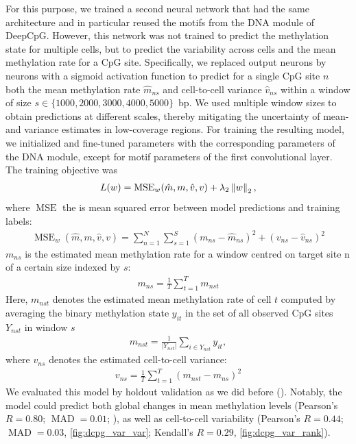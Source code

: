 For this purpose, we trained a second neural network that had the same architecture and in particular reused the motifs from the DNA module of DeepCpG. However, this network was not trained to predict the methylation state for multiple cells, but to predict the variability across cells and the mean methylation rate for a CpG site. Specifically, we replaced output neurons by neurons with a sigmoid activation function to predict for a single CpG site $n$ both the mean methylation rate $\hat{m}_{ns}$ and cell-to-cell variance $\hat{v}_{ns}$ within a window of size $s\in\{1000,2000,3000,4000,5000\}$~bp. We used multiple window sizes to obtain predictions at different scales, thereby mitigating the uncertainty of mean- and variance estimates in low-coverage regions. For training the resulting model, we initialized and fine-tuned parameters with the corresponding parameters of the DNA module, except for motif parameters of the first convolutional layer. The training objective was
\newcommand{\Xmse}{\operatorname{MSE}}
\begin{align}
  L(w)=\Xmse_w (\hat{m},m,\hat{v},v)+\lambda_2 \norm{w}_2,
\end{align}
where $\Xmse$ the is mean squared error between model predictions and training labels:
\begin{align}
  \Xmse_w(\hat{m},m,\hat{v},v)=\sum_{n=1}^{N}\sum_{s=1}^S (m_{ns}-\hat{m}_{ns})^2+(v_{ns}-\hat{v}_{ns})^2
\end{align}
$m_{ns}$ is the estimated mean methylation rate for a window centred on target site n of a certain size indexed by $s$:
\begin{align}
  m_{ns}=\frac{1}{T}\sum_{t=1}^T m_{nst}
\end{align}
Here, $m_{nst}$ denotes the estimated mean methylation rate of cell $t$ computed by averaging the binary methylation state $y_{it}$ in the set of all observed CpG sites $Y_{nst}$ in window $s$
\begin{align}
  m_{nst}=\frac{1}{|Y_{nst}|} \sum_{i \in Y_{nst}} y_{it},
\end{align}
where $v_{ns}$ denotes the estimated cell-to-cell variance:
\begin{align}
  v_{ns}=\frac{1}{T} \sum_{t=1}^T (m_{nst}-m_{ns})^2
\end{align}
We evaluated this model by holdout validation as we did before (). Notably, the model could predict both global changes in mean methylation levels (Pearson's $R=0.80$; $\operatorname{MAD}=0.01$; ), as well as cell-to-cell variability (Pearson's $R=0.44$; $\operatorname{MAD}=0.03$, \cref{fig:dcpg_var_var}; Kendall's $R=0.29$, \cref{fig:dcpg_var_rank}).

